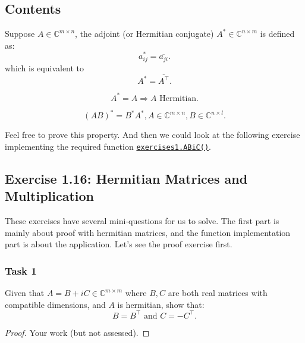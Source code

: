 \subsection*{Contents}
\begin{definition}
  Suppose \(A \in \mathbb{C}^{m \times n}\), the adjoint (or Hermitian conjugate) \(A^{*} \in \mathbb{C}^{n \times m}\) is defined as:
  \[
    a^{*}_{ij} = \overline{a_{ji}}
  .\]
  which is equivalent to
  \[
    A^{*} = \overline{A^{\top}}
  .\]
\end{definition}
\begin{definition}
  \[
    A^{*} = A \Rightarrow A \text{ Hermitian}  
  .\]
\end{definition}
\begin{property}
  \[ 
  (AB)^{*} = B^{*}A^{*}, A \in \mathbb{C}^{m \times n}, B \in \mathbb{C}^{n \times l}
.\] 
\end{property}
Feel free to prove this property.
And then we could look at the following exercise implementing the required function \href{https://comp-lin-alg.github.io/cla_utils.html#cla_utils.exercises1.ABiC}{\texttt{exercises1.ABiC()}}. \checked
\subsection*{Exercise 1.16: Hermitian Matrices and Multiplication}%
These exercises have several mini-questions for us to solve. The first part is mainly about proof with hermitian matrices, and the function implementation part is about the application. Let's see the proof exercise first.

\subsubsection*{Task 1}%

\noindent Given that $A = B + iC \in \mathbb{C}^{m \times m}$ where $B, C$ are both real matrices with compatible dimensions, and  $A$ is hermitian, show that:
\[
  B = B^{\top} \text{ and } C = -C^{\top}
.\]
\begin{proof}
  Your work (but not assessed).
\end{proof}
